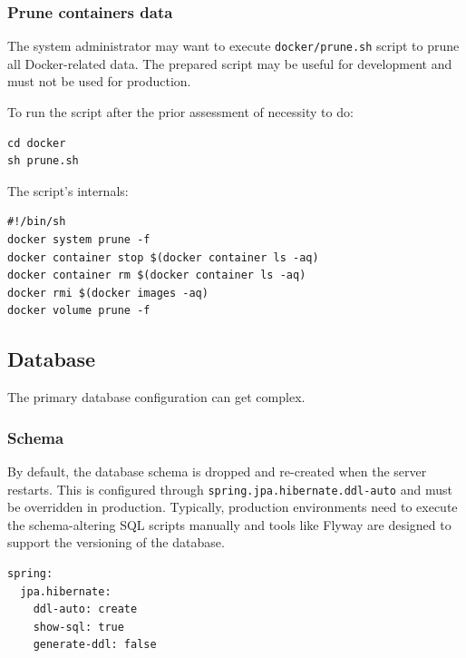 \documentclass[a4paper,twoside,12pt]{book}
\begin{document}
\subsubsection{Prune containers data}

The system administrator may want to execute \verb|docker/prune.sh| script to prune all Docker-related data. The prepared script may be useful for development and must not be used for production.

To run the script after the prior assessment of necessity to do:
\begin{verbatim}
cd docker
sh prune.sh
\end{verbatim}

The script's internals:
\begin{verbatim}
#!/bin/sh
docker system prune -f
docker container stop $(docker container ls -aq)
docker container rm $(docker container ls -aq)
docker rmi $(docker images -aq)
docker volume prune -f
\end{verbatim}


\subsection{Database}

The primary database configuration can get complex.

\subsubsection{Schema}

By default, the database schema is dropped and re-created when the server restarts. This is configured through \verb|spring.jpa.hibernate.ddl-auto| and must be overridden in production. Typically, production environments need to execute the schema-altering SQL scripts manually and tools like Flyway \cite{bib:flyway} are designed to support the versioning of the database.

\begin{verbatim}
spring:
  jpa.hibernate:
    ddl-auto: create
    show-sql: true
    generate-ddl: false
\end{verbatim}
\end{document}
